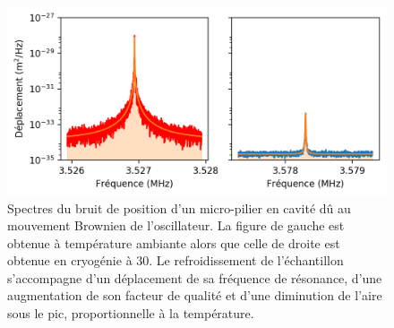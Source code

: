 \documentclass[12pt,a4paper]{article}
\begin{document}
\begin{figure}
\center
\includegraphics[scale=0.75]{figures/thermal_peak_def_filled.png}
\caption{Spectres du bruit de position d'un micro-pilier en cavité dû au mouvement Brownien de l'oscillateur.
La figure de gauche est obtenue à température ambiante alors que celle de droite est obtenue en cryogénie à \unit{30}{\milli\kelvin}.
Le refroidissement de l'échantillon s'accompagne d'un déplacement de sa fréquence de résonance, d'une augmentation de son facteur de qualité et d'une diminution de l'aire sous le pic, proportionnelle à la température.}
\end{figure}
\end{document}
